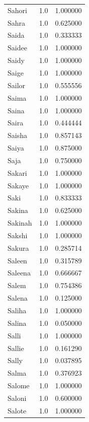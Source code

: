\documentclass[
  letterpaper,
  DIV=11,
  numbers=noendperiod]{scrreprt}
\begin{document}
\begin{tabular}{lrr}
Sahori          &   1.0 &   1.000000 \\
Sahra           &   1.0 &   0.625000 \\
Saida           &   1.0 &   0.333333 \\
Saidee          &   1.0 &   1.000000 \\
Saidy           &   1.0 &   1.000000 \\
Saige           &   1.0 &   1.000000 \\
Sailor          &   1.0 &   0.555556 \\
Saima           &   1.0 &   1.000000 \\
Saina           &   1.0 &   1.000000 \\
Saira           &   1.0 &   0.444444 \\
Saisha          &   1.0 &   0.857143 \\
Saiya           &   1.0 &   0.875000 \\
Saja            &   1.0 &   0.750000 \\
Sakari          &   1.0 &   1.000000 \\
Sakaye          &   1.0 &   1.000000 \\
Saki            &   1.0 &   0.833333 \\
Sakina          &   1.0 &   0.625000 \\
Sakinah         &   1.0 &   1.000000 \\
Sakshi          &   1.0 &   1.000000 \\
Sakura          &   1.0 &   0.285714 \\
Saleen          &   1.0 &   0.315789 \\
Saleena         &   1.0 &   0.666667 \\
Salem           &   1.0 &   0.754386 \\
Salena          &   1.0 &   0.125000 \\
Saliha          &   1.0 &   1.000000 \\
Salina          &   1.0 &   0.050000 \\
Salli           &   1.0 &   1.000000 \\
Sallie          &   1.0 &   0.161290 \\
Sally           &   1.0 &   0.037895 \\
Salma           &   1.0 &   0.376923 \\
Salome          &   1.0 &   1.000000 \\
Saloni          &   1.0 &   0.600000 \\
Salote          &   1.0 &   1.000000 \\

\end{tabular}
\end{document}
